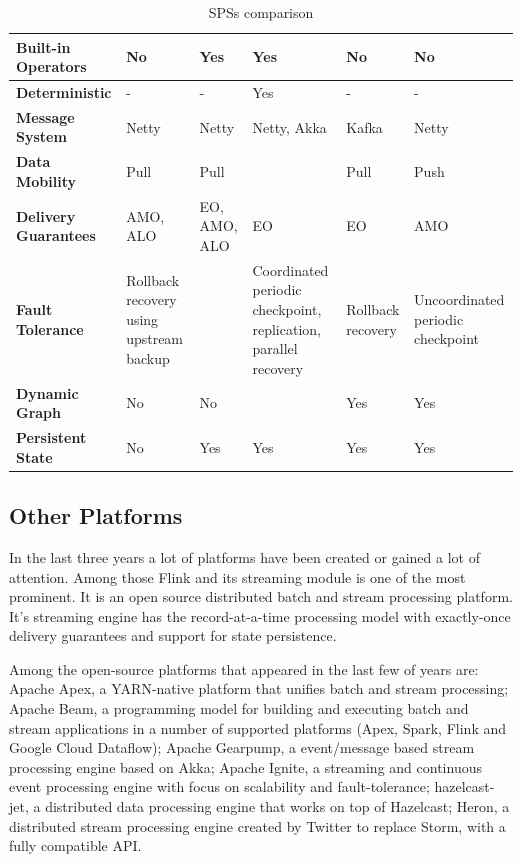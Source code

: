 \documentclass[ppgc,diss,english]{iiufrgs}
\begin{document}
\begin{table}[t]
\begin{center}
\begin{tabular}{ | p{2.5cm} | p{2cm} | p{2.5cm} | p{2.5cm} | p{2cm} | p{2cm} |}
        \textbf{Built-in Operators}      & No & Yes & Yes & No & No \\\hline
        \textbf{Deterministic}           & - & - & Yes & - & - \\\hline
        
        \textbf{Message System}          & Netty & Netty & Netty, Akka & Kafka & Netty \\\hline
        \textbf{Data Mobility}\cite{kamburugamuvesurvey}          & Pull & Pull &  & Pull & Push \\\hline
        \textbf{Delivery Guarantees}\cite{bockermann2014survey}    & AMO, ALO & EO, AMO, ALO & EO & EO & AMO \\\hline
        \textbf{Fault Tolerance}\cite{gradvohl2014comparing}         & Rollback recovery using upstream backup &  & Coordinated periodic checkpoint, replication, parallel recovery & Rollback recovery \cite{kamburugamuvesurvey}  & Uncoordinated periodic checkpoint \\\hline
        \textbf{Dynamic Graph}           & No & No &  & Yes & Yes \\\hline
        \textbf{Persistent State}        & No & Yes & Yes & Yes & Yes \\\hline
        
	\end{tabular}
	\begin{flushleft}
	\end{flushleft}
	\caption{SPSs comparison}
	\label{table:sps_comparison}
\end{center}
\end{table}

\subsection{Other Platforms}

In the last three years a lot of platforms have been created or gained a lot of attention. Among those Flink and its streaming module is one of the most prominent. It is an open source distributed batch and stream processing platform. It's streaming engine has the record-at-a-time processing model with exactly-once delivery guarantees and support for state persistence.

Among the open-source platforms that appeared in the last few of years are: Apache Apex, a YARN-native platform that unifies batch and stream processing; Apache Beam, a programming model for building and executing batch and stream applications in a number of supported platforms (Apex, Spark, Flink and Google Cloud Dataflow); Apache Gearpump, a event/message based stream processing engine based on Akka; Apache Ignite, a streaming and continuous event processing engine with focus on scalability and fault-tolerance; hazelcast-jet, a distributed data processing engine that works on top of Hazelcast; Heron, a distributed stream processing engine created by Twitter to replace Storm, with a fully compatible API.
\end{document}
